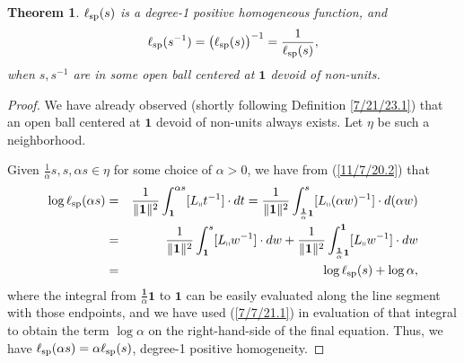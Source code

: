\documentclass{amsart}
\numberwithin{equation}{section}
\newtheorem{theorem}{Theorem}
\theoremstyle{definition}
\numberwithin{theorem}{section}
\begin{document}
\begin{theorem}\label{9/24/23.1} $ \ell_{\rm sp}(s)$ is a degree-1 positive homogeneous function, and
\begin{equation}\label{5/23/23.3}  \ell_{\rm sp}(s^{-1}) = \big(\ell_{\rm sp}(s)\big)^{-1} = \frac{1}{\ell_{\rm sp}(s)}, \end{equation} when $s,s^{-1}$ are in some open ball centered at $\mathbf{1}$ devoid of non-units. \end{theorem}

\begin{proof} We have already observed (shortly following Definition \ref{7/21/23.1}) that an open ball centered at $\mathbf{1}$ devoid of non-units always exists.  Let $\eta$  be such a neighborhood.

Given $\frac{1}{\alpha}s,s,\alpha s\in\eta$ for some choice of $\alpha>0$, we have from (\ref{11/7/20.2}) that
\begin{eqnarray}\nonumber  \log\ell_{\rm sp}(\alpha s) &=&  \frac{1}{\|{\bf 1}\|^2}\int_{\bf 1}^{\alpha s} [L_{\shortparallel}t^{-1}]\cdot dt = \frac{1}{\|{\bf 1}\|^2}\int_{\frac{\mathbf{1}}{\alpha}\mathbf{1}}^{s} [L_{\shortparallel}(\alpha w)^{-1}]\cdot d(\alpha w)  \\ \nonumber &=&  \frac{1}{\|{\bf 1}\|^2}\int_{\mathbf{1}}^{s} [L_{\shortparallel}w^{-1}]\cdot dw + \frac{1}{\|{\bf 1}\|^2}\int_{\frac{\mathbf{1}}{\alpha} \mathbf{1}}^{\mathbf{1}} [L_{\shortparallel}w^{-1}]\cdot dw  \\ &=& \log \ell_{\rm sp}(s) + \log\alpha, \label{4/2/23.1}
\end{eqnarray} where the integral from $\frac{\mathbf{1}}{\alpha} \mathbf{1}$ to $\mathbf{1}$ can be easily evaluated along the line segment with those endpoints, and we have used (\ref{7/7/21.1}) in evaluation of that integral to obtain the term $\log \alpha$ on the right-hand-side of the final equation.  Thus, we have $\ell_{\rm sp}(\alpha s) = \alpha\ell_{\rm sp}(s)$, degree-1 positive homogeneity.


\end{proof}
\end{document}
